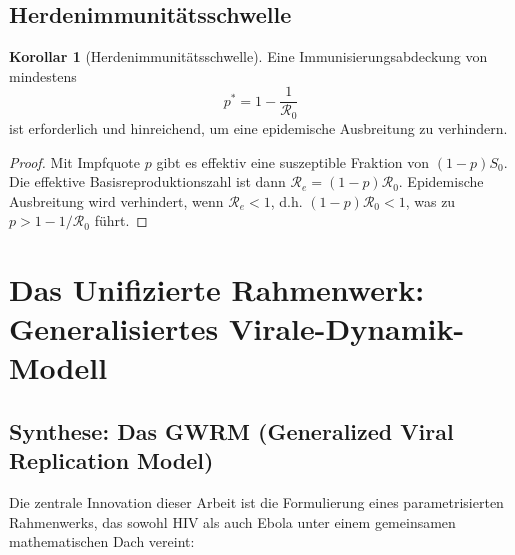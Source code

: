 ﻿\documentclass[a4paper,12pt]{article}
\theoremstyle{definition}
\newtheorem{korollar}{Korollar}
\begin{document}
\subsection{Herdenimmunitätsschwelle}

\begin{korollar}[Herdenimmunitätsschwelle]
Eine Immunisierungsabdeckung von mindestens
\[
p^* = 1 - \frac{1}{\mathcal{R}_0}
\]
ist erforderlich und hinreichend, um eine epidemische Ausbreitung zu verhindern.
\end{korollar}

\begin{proof}
Mit Impfquote $p$ gibt es effektiv eine suszeptible Fraktion von $(1-p) S_0$. Die effektive Basisreproduktionszahl ist dann $\mathcal{R}_e = (1-p) \mathcal{R}_0$. Epidemische Ausbreitung wird verhindert, wenn $\mathcal{R}_e < 1$, d.h. $(1-p) \mathcal{R}_0 < 1$, was zu $p > 1 - 1/\mathcal{R}_0$ führt.
\end{proof}

\section{Das Unifizierte Rahmenwerk: Generalisiertes Virale-Dynamik-Modell}

\subsection{Synthese: Das GWRM (Generalized Viral Replication Model)}

Die zentrale Innovation dieser Arbeit ist die Formulierung eines parametrisierten Rahmenwerks, das sowohl HIV als auch Ebola unter einem gemeinsamen mathematischen Dach vereint:
\end{document}
